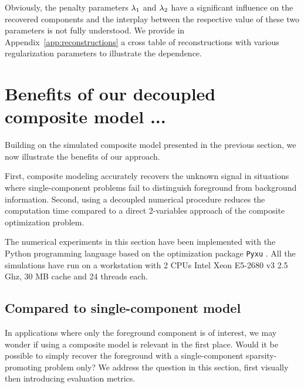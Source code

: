         Obviously, the penalty parameters $\lambda_{1}$ and $\lambda_{2}$ have a significant influence on the recovered components and the interplay between the respective value of these two parameters is not fully understood. We provide in Appendix~\ref{app:reconstructions} a cross table of reconstructions with various regularization parameters to illustrate the dependence. 
        
\section{Benefits of our decoupled composite model ...}
    
    Building on the simulated composite model presented in the previous section, we now illustrate the benefits of our approach.
    
    First, composite modeling accurately recovers the unknown signal in situations where single-component problems fail to distinguish foreground from background information. Second, using a decoupled numerical procedure reduces the computation time compared to a direct 2-variables approach of the composite optimization problem.

    The numerical experiments in this section have been implemented with the Python programming language based on the optimization package \texttt{Pyxu} \cite{pyxu-framework}. All the simulations have run on a workstation with 2 CPUs Intel Xeon E5-2680 v3 \@2.5 Ghz, 30 MB cache and 24 threads each. 

    \subsection{Compared to single-component model}
    \label{sec:bene:comp}
        In applications where only the foreground component is of interest, we may wonder if using a composite model is relevant in the first place. Would it be possible to simply recover the foreground with a single-component sparsity-promoting problem only? We address the question in this section, first visually then introducing evaluation metrics.

